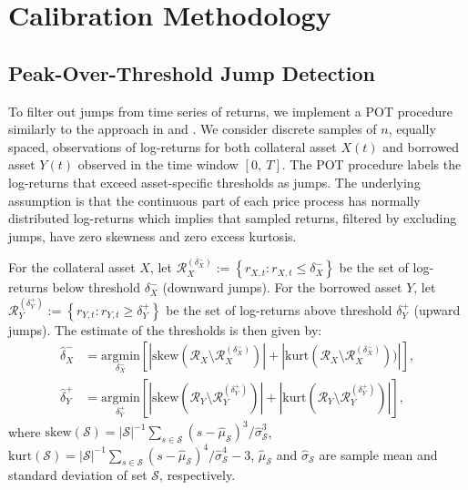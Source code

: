 \documentclass{article}
\theoremstyle{definition}
\begin{document}
\section{Calibration Methodology}

\subsection{Peak-Over-Threshold Jump Detection}\label{sec:firststage}

To filter out jumps from time series of returns, we implement a POT procedure similarly to the approach in \cite{embrechts2011multivariate} and \cite[Chapter 4]{hainaut2022continuous}. We consider discrete samples of $n$, equally spaced, observations of log-returns for both collateral asset $X(t)$ and borrowed asset $Y(t)$ observed in the time window $[0,\ T]$.
The POT procedure labels the log-returns that exceed asset-specific thresholds as jumps. The underlying assumption is that the continuous part of each price process has normally distributed log-returns which implies that sampled returns, filtered by excluding jumps, have zero skewness and zero excess kurtosis.

For the collateral asset $X$, let $\mathcal{R}_X^{(\delta_X^-)}:=\left\{r_{X,t}: r_{X,t} \leq \delta_X^-\right\}$ be the set of log-returns below threshold $\delta_X^-$ (downward jumps). For the borrowed asset $Y$, let $\mathcal{R}_Y^{(\delta_Y^+)}:=\left\{r_{Y,t}: r_{Y,t} \geq \delta_Y^+\right\}$ be the set of log-returns above threshold $\delta_Y^+$ (upward jumps).
The estimate of the thresholds is then given by:
\begin{align}
 \widehat\delta_X^- &= \underset{\delta_X^-}{\text{argmin}}  \left[
   |\text{skew}(\mathcal{R}_X \setminus \mathcal{R}_X^{(\delta_X^-)})|+|\text{kurt}(\mathcal{R}_X \setminus \mathcal{R}_X^{(\delta_X^-)}))|
   \right], \\
 \widehat\delta_Y^+ &= \underset{\delta_Y^+}{\text{argmin}}  \left[
   |\text{skew}(\mathcal{R}_Y \setminus \mathcal{R}_Y^{(\delta_Y^+)})|+|\text{kurt}(\mathcal{R}_Y \setminus \mathcal{R}_Y^{(\delta_Y^+)})|
   \right],
\end{align}
where $\text{skew}(\mathcal{S}) = |\mathcal{S}|^{-1}\sum_{s \in \mathcal{S}}(s-\hat \mu_\mathcal{S})^3/\hat \sigma_\mathcal{S}^3$, 
      $\text{kurt}(\mathcal{S}) = |\mathcal{S}|^{-1}\sum_{s \in \mathcal{S}}(s-\hat \mu_\mathcal{S})^4/\hat \sigma_\mathcal{S}^4 - 3$, 
     $\hat \mu_\mathcal{S}$ and $\hat \sigma_\mathcal{S}$ are sample mean and standard deviation of set $\mathcal{S}$, respectively.
\end{document}
